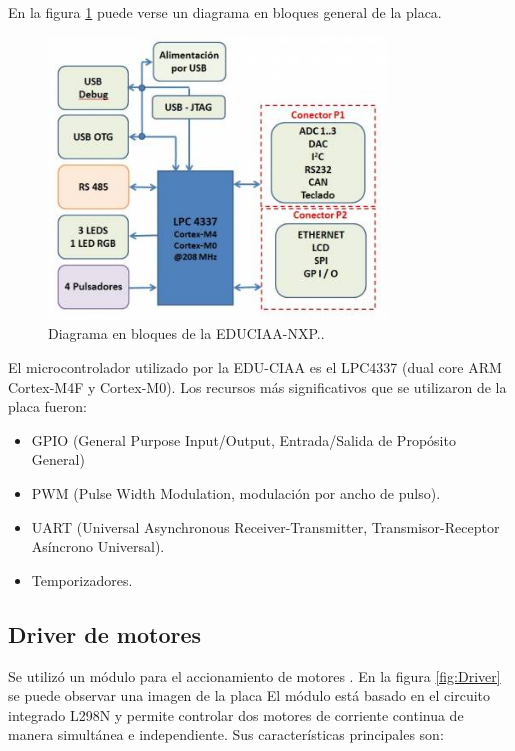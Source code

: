 \pagebreak

En la figura \ref{fig:Bloques} puede verse un diagrama en bloques general de la placa. 

\begin{figure}[htpb]
	\centering
	\includegraphics[width=9cm]{./Figures/Bloques.jpg}
	\caption{Diagrama en bloques de la EDUCIAA-NXP.\protect\footnotemark.}
	\label{fig:Bloques}
\end{figure}

El  microcontrolador utilizado por la EDU-CIAA es el LPC4337 (dual core ARM Cortex-M4F y Cortex-M0). Los recursos más significativos que se utilizaron de la placa fueron: 


\begin{itemize}
	\item GPIO (General Purpose Input/Output, Entrada/Salida de Propósito General)
	\item PWM (Pulse Width Modulation, modulación por ancho de pulso).
	\item UART (Universal Asynchronous Receiver-Transmitter, Transmisor-Receptor Asíncrono Universal).
	\item Temporizadores.
\end{itemize}


\subsection{Driver de motores}

Se utilizó un módulo para el accionamiento de motores \citep{Driver}. En la figura \ref{fig:Driver} se puede observar una imagen de la placa 
El módulo está basado en el circuito integrado L298N \citep{L298} y permite controlar dos motores de corriente continua de manera simultánea e independiente.  Sus características principales son:

